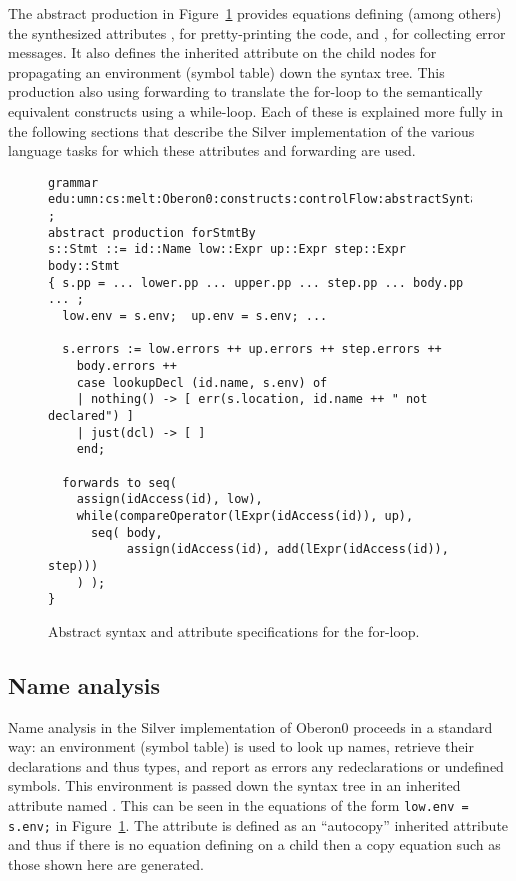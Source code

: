 The abstract production  in
Figure~\ref{silver:fig:abstract-for} provides equations defining
(among others) the synthesized attributes , for
pretty-printing the code, and , for collecting error
messages.  It also defines the inherited attribute  on the
child nodes for propagating an environment (symbol table) down the
syntax tree.  This production also using forwarding to translate the
for-loop to the semantically equivalent constructs using a while-loop.
Each of these is explained more fully in the following sections that
describe the Silver implementation of the various language tasks for
which these attributes and forwarding are used.
\begin{figure}
{\small
\begin{verbatim}
grammar edu:umn:cs:melt:Oberon0:constructs:controlFlow:abstractSyntax ;
abstract production forStmtBy
s::Stmt ::= id::Name low::Expr up::Expr step::Expr body::Stmt
{ s.pp = ... lower.pp ... upper.pp ... step.pp ... body.pp ... ;
  low.env = s.env;  up.env = s.env; ...

  s.errors := low.errors ++ up.errors ++ step.errors ++ 
    body.errors ++
    case lookupDecl (id.name, s.env) of
    | nothing() -> [ err(s.location, id.name ++ " not declared") ]
    | just(dcl) -> [ ]
    end;

  forwards to seq( 
    assign(idAccess(id), low),
    while(compareOperator(lExpr(idAccess(id)), up),
      seq( body,
           assign(idAccess(id), add(lExpr(idAccess(id)), step)))
    ) );
}
\end{verbatim}
}
\caption{Abstract syntax and attribute specifications for the for-loop.}
\label{silver:fig:abstract-for}
\end{figure}


\subsection{Name analysis}

Name analysis in the Silver implementation of Oberon0 proceeds in a
standard way: an environment (symbol table) is used to look up names,
retrieve their declarations and thus types, and report as errors any
redeclarations or undefined symbols.  This environment is passed down
the syntax tree in an inherited attribute named .  This can
be seen in the equations of the form \texttt{low.env = s.env;} in
Figure~\ref{silver:fig:abstract-for}.  The  attribute is
defined as an ``autocopy'' inherited attribute and thus if there is no
equation defining  on a child then a copy equation such as
those shown here are generated.

